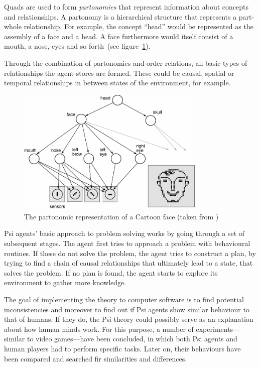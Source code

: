 Quads are used to form \emph{partonomies} that represent information about concepts and relationships. A partonomy is a hierarchical structure that represents a part-whole relationship. For example, the concept ``head'' would be represented as the assembly of a face and a head. A face furthermore would itself consist of a mouth, a nose, eyes and so forth~(see figure~\ref{partonomy}). 

Through the combination of partonomies and order relations, all basic types of relationships the agent stores are formed. These could be causal, spatial or temporal relationships in between states of the environment, for example.

\begin{figure}[h]
  \centering
    \includegraphics[width=9cm]{graphics/partonomy}
  \caption{The partonomic representation of a Cartoon face (taken from \cite{Bach:2009:PSI:1611304})}
  \label{partonomy}
\end{figure}

Psi agents' basic approach to problem solving works by going through a set of subsequent stages. The agent first tries to approach a problem with behavioural routines. If these do not solve the problem, the agent tries to construct a plan, by trying to find a chain of causal relationships that ultimately lead to a state, that solves the problem. If no plan is found, the agent starts to explore its environment to gather more knowledge.

The goal of implementing the theory to computer software is to find potential inconsistencies and moreover to find out if Psi agents show similar behaviour to that of humans. If they do, the Psi theory could possibly serve as an explanation about how human minds work. For this purpose, a number of experiments---similar to video games---have been concluded, in which both Psi agents and human players had to perform specific tasks. Later on, their behaviours have been compared and searched fir similarities and differences.
 
